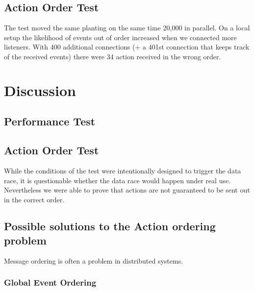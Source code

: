 \documentclass[final,oneside]{vutinfth}
\begin{document}
\section{Action Order Test}

The test moved the same planting on the same time 20,000 in parallel.
On a local setup the likelihood of events out of order increased when we connected more listeners.
With 400 additional connections (+ a 401st connection that keeps track of the received events) there were 34 action received in the wrong order.

\chapter{Discussion}

\section{Performance Test}

\section{Action Order Test}

While the conditions of the test were intentionally designed to trigger the data race, it is questionable whether the data race would happen under real use.
Nevertheless we were able to prove that actions are not guaranteed to be sent out in the correct order.

\section{Possible solutions to the Action ordering problem}

Message ordering is often a problem in distributed systems.

\subsection{Global Event Ordering}

\printglossary[type=\acronymtype,title=Acronyms]

\backmatter



\end{document}
